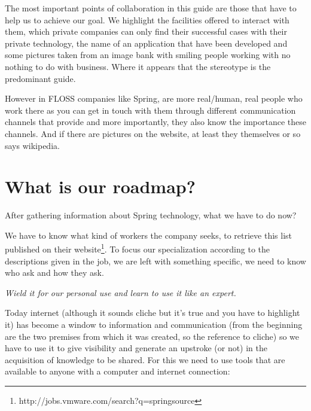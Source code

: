 \documentclass[11pt]{scrartcl}
\begin{document}
\par The most important points of collaboration in this guide are those that have to help us to achieve our goal. We highlight the facilities offered to interact with them, which private companies can only find their successful cases with their private technology, the name of an application that have been developed and some pictures taken from an image bank with smiling people working with no nothing to do with business. Where it appears that the stereotype is the predominant guide.

\par However in FLOSS companies like Spring, are more real/human, real people who work there as you can get in touch with them through different communication channels that provide and more importantly, they also know the importance these channels. And if there are pictures on the website, at least they themselves or so says wikipedia.

\section{What is our roadmap?}

\par After gathering information about Spring technology, what we have to do now?

\par We have to know what kind of workers the company seeks, to retrieve this list published on their website\footnote{http://jobs.vmware.com/search?q=springsource}. To focus our specialization according to the descriptions given in the job, we are left with something specific, we need to know who ask and how they ask.

\par \emph{Wield it for our personal use and learn to use it like an expert.}

\par Today internet (although it sounds cliche but it's true and you have to highlight it) has become a window to information and communication (from the beginning are the two premises from which it was created, so the reference to cliche) so we have to use it to give visibility and generate an upstroke (or not) in the acquisition of knowledge to be shared. For this we need to use tools that are available to anyone with a computer and internet connection:
\end{document}
